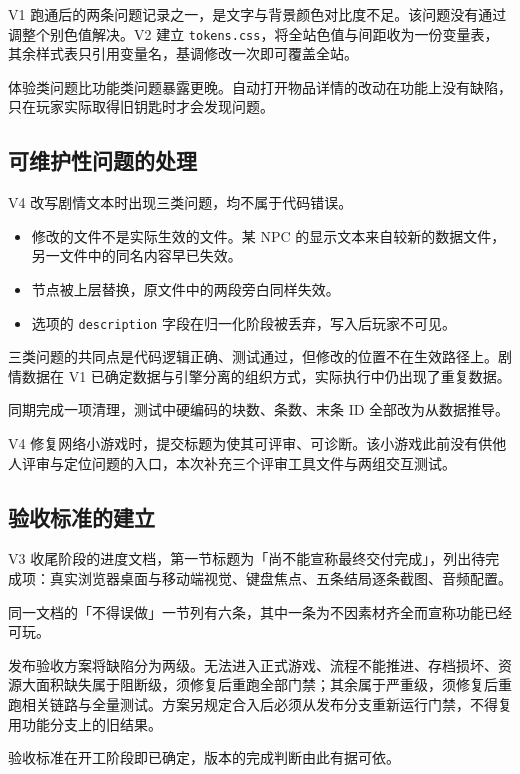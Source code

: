 V1 跑通后的两条问题记录之一，是文字与背景颜色对比度不足。该问题没有通过调整个别色值解决。V2 建立 \texttt{tokens.css}，将全站色值与间距收为一份变量表，其余样式表只引用变量名，基调修改一次即可覆盖全站。

体验类问题比功能类问题暴露更晚。自动打开物品详情的改动在功能上没有缺陷，只在玩家实际取得旧钥匙时才会发现问题。

\subsection{可维护性问题的处理}

V4 改写剧情文本时出现三类问题，均不属于代码错误。

\begin{itemize}
  \item 修改的文件不是实际生效的文件。某 NPC 的显示文本来自较新的数据文件，另一文件中的同名内容早已失效。
  \item 节点被上层替换，原文件中的两段旁白同样失效。
  \item 选项的 \texttt{description} 字段在归一化阶段被丢弃，写入后玩家不可见。
\end{itemize}

三类问题的共同点是代码逻辑正确、测试通过，但修改的位置不在生效路径上。剧情数据在 V1 已确定数据与引擎分离的组织方式，实际执行中仍出现了重复数据。

同期完成一项清理，测试中硬编码的块数、条数、末条 ID 全部改为从数据推导。

V4 修复网络小游戏时，提交标题为使其可评审、可诊断。该小游戏此前没有供他人评审与定位问题的入口，本次补充三个评审工具文件与两组交互测试。

\subsection{验收标准的建立}

V3 收尾阶段的进度文档，第一节标题为「尚不能宣称最终交付完成」，列出待完成项：真实浏览器桌面与移动端视觉、键盘焦点、五条结局逐条截图、音频配置。

同一文档的「不得误做」一节列有六条，其中一条为不因素材齐全而宣称功能已经可玩。

发布验收方案将缺陷分为两级。无法进入正式游戏、流程不能推进、存档损坏、资源大面积缺失属于阻断级，须修复后重跑全部门禁；其余属于严重级，须修复后重跑相关链路与全量测试。方案另规定合入后必须从发布分支重新运行门禁，不得复用功能分支上的旧结果。

验收标准在开工阶段即已确定，版本的完成判断由此有据可依。

